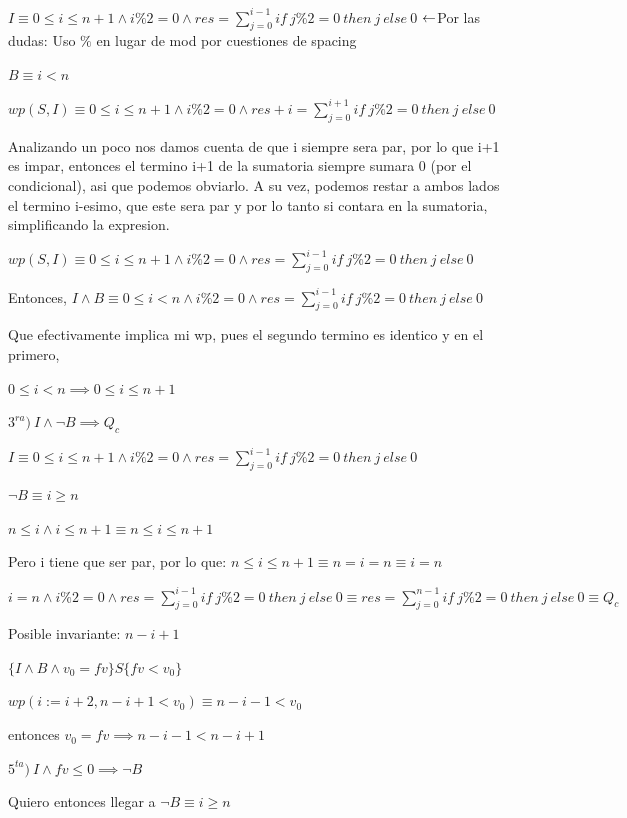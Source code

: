 \documentclass[a4paper,10pt]{article}
\begin{document}
    \salto{\baselineskip}

$I\equiv 0\leq i\leq n+1 \land i\%2=0 \land res=\sum_{j=0}^{i-1}if\ j\%2 = 0\ then\ j\ else\ 0$ {\small {\color{Violet}$\hfill \leftarrow$Por las dudas: Uso $\%$ en lugar de mod por cuestiones de spacing}}

$B\equiv i<n$

$wp(S,I)\equiv 0\leq i\leq n+1 \land i\%2=0 \land res+i=\sum_{j=0}^{i+1}if\ j\%2 = 0\ then\ j\ else\ 0$

    Analizando un poco nos damos cuenta de que i siempre sera par, por lo que i+1 es impar, entonces el termino i+1 de la sumatoria siempre sumara 0 (por el condicional), asi que podemos obviarlo. A su vez, podemos restar a ambos lados el termino i-esimo, que este sera par y por lo tanto si contara en la sumatoria, simplificando la expresion.

$wp(S,I)\equiv 0\leq i\leq n+1 \land i\%2=0 \land res=\sum_{j=0}^{i-1}if\ j\%2 = 0\ then\ j\ else\ 0$

    Entonces, $I\land B \equiv 0\leq i<n \land i\%2=0 \land res=\sum_{j=0}^{i-1}if\ j\%2 = 0\ then\ j\ else\ 0$

    Que efectivamente implica mi wp, pues el segundo termino es identico y en el primero,

$0\leq i<n\implies 0\leq i\leq n+1$

    \salto{\baselineskip}

$3^{ra})\ I\land\lnot B\implies Q_c$

$I\equiv 0\leq i\leq n+1 \land i\%2=0 \land res=\sum_{j=0}^{i-1}if\ j\%2 = 0\ then\ j\ else\ 0$

$\lnot B\equiv i\geq n$

$n\leq i \land i\leq n+1\equiv n\leq i\leq n+1$

    Pero i tiene que ser par, por lo que: $n\leq i\leq n+1\equiv n=i=n \equiv i=n$

$i=n \land i\%2=0 \land res=\sum_{j=0}^{i-1}if\ j\%2 = 0\ then\ j\ else\ 0 \equiv res=\sum_{j=0}^{n-1}if\ j\%2 = 0\ then\ j\ else\ 0 \equiv Q_c$

    Posible invariante: $n-i+1$

$\{I\land B\land v_0=fv\} S \{fv<v_0\}$

$wp(i:=i+2, n-i+1<v_0)\equiv n-i-1<v_0$

    entonces $v_0=fv \implies n-i-1<n-i+1$

$5^{ta})\ I\land fv\leq 0 \implies \lnot B$

    Quiero entonces llegar a $\lnot B \equiv i\geq n$
\end{document}
